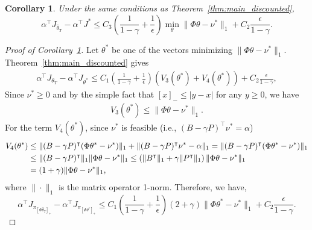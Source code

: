 \documentclass[11pt]{article}
\newtheorem{corollary}[theorem]{Corollary}
\begin{document}
\begin{corollary}
\label{cor:discounted_error_bound}
Under the same conditions as Theorem~\ref{thm:main_discounted},
\begin{equation}
  \alpha^\top J_{\widehat\theta_T} -\alpha^\top J^* \leq  C_3
  \left( \frac{1}{1-\gamma} + \frac{1}{\epsilon} \right)
  \min_{\theta}  \|\Phi \theta   -\nu^* \|_1 + C_2 \frac{\epsilon}{1-\gamma}.
\end{equation}
\end{corollary}
\begin{proof}[Proof of Corollary~\ref{cor:discounted_error_bound}]
Let $\theta^*$  be one of the vectors minimizing
$ \|\Phi\theta-\nu^*\|_1$. Theorem~\ref{thm:main_discounted} gives
\begin{eqnarray*}
  \alpha^\top J_{\theta_T} - \alpha^\top J_{\theta^*} \leq C_1
\left( \frac{1}{1-\gamma} + \frac{1}{\epsilon} \right)
\left(V_3(\theta^*)+V_4(\theta^*)\right) + C_2 \frac{\epsilon}{1-\gamma},
\end{eqnarray*}
Since $\nu^* \geq 0$ and by the simple fact that
$[x]_{-} \leq |y-x|$ for any $y \geq 0$, we have
\begin{eqnarray}
  V_3(\theta^*) \leq \|\Phi\theta-\nu^*\|_1.
  \label{eq:V_3_star}
\end{eqnarray}
For the term $V_4(\theta^*)$, since $\nu^*$ is feasible (i.e., $(B-\gamma P)^\top \nu^*=\alpha$)
\begin{align}
  V_4(\theta^*) &\leq \|(B-\gamma P)^\top  (\Phi \theta^* -\nu^*) \|_1 + \|(B-\gamma P)^\top \nu^*-\alpha\|_1 =\|(B-\gamma P)^\top  (\Phi \theta^* -\nu^*) \|_1 \notag\\
                & \leq \|(B-\gamma P)^\top \|_{1} \|\Phi\theta-\nu^*\|_1 \leq \left( \|B^\top \|_{1} +\gamma \|P^\top \|_{1} \right) \|\Phi\theta-\nu^*\|_1  \notag\\
                & =(1 + \gamma) \|\Phi\theta-\nu^*\|_1,
  \label{eq:V_4_star}
\end{align}
where $\|\cdot\|_1$ is the matrix operator 1-norm.
Therefore, we have,
\begin{equation*}
  \alpha^\top J_{\pi_{ [\Phi \widehat\theta_T]_{+}}} - \alpha^\top J_{\pi_{ [\Phi \theta^*]_{+}}} \leq C_1  \left( \frac{1}{1-\gamma} + \frac{1}{\epsilon} \right)
  (2 + \gamma) \|\Phi \theta^*  -\nu^*  \|_1 + C_2 \frac{\epsilon}{1-\gamma}.
  \label{eq:gap_opt_theta}
\end{equation*}

\end{proof}
\end{document}
